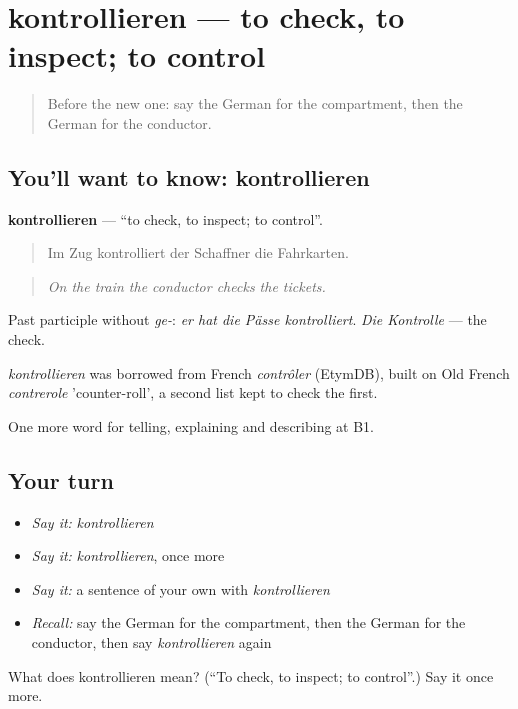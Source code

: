 \section[kontrollieren]{kontrollieren — to check, to inspect; to control}

\label{lesson:GE-C412-kontrollieren}



\begin{quote}
Before the new one: say the German for the compartment, then the German for the conductor.
\end{quote}

\subsection*{You'll want to know: kontrollieren}
\textbf{kontrollieren} — \textquotedblleft{}to check, to inspect; to control\textquotedblright{}.

\begin{quote}
Im Zug kontrolliert der Schaffner die Fahrkarten.
\end{quote}

\begin{quote}
\emph{On the train the conductor checks the tickets.}
\end{quote}

Past participle without \emph{ge-}: \emph{er hat die Pässe kontrolliert}. \emph{Die Kontrolle} — the check.

\begin{cousinweb}
\emph{kontrollieren} was borrowed from French \emph{contrôler} (EtymDB), built on Old French \emph{contrerole} 'counter-roll', a second list kept to check the first.
\end{cousinweb}

\begin{grammarlens}[title={What you've built}]
One more word for telling, explaining and describing at B1.
\end{grammarlens}

\subsection*{Your turn}
\begin{itemize}
\raggedright
  \item \emph{Say it:} \emph{kontrollieren}
  \item \emph{Say it:} \emph{kontrollieren}, once more
  \item \emph{Say it:} a sentence of your own with \emph{kontrollieren}
  \item \emph{Recall:} say the German for the compartment, then the German for the conductor, then say \emph{kontrollieren} again
\end{itemize}

\begin{tcolorbox}[breakable,colback=teal!4,colframe=teal!35!black,title={Before you move on}]
What does kontrollieren mean? (\textquotedblleft{}To check, to inspect; to control\textquotedblright{}.) Say it once more.
\end{tcolorbox}
